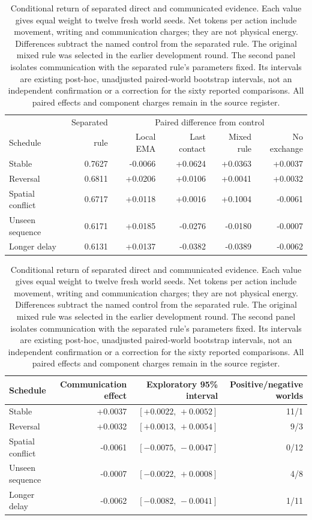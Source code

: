 \begin{table}[htbp]\centering\small
\caption{Conditional return of separated direct and communicated evidence. Each value gives equal weight to twelve fresh world seeds. Net tokens per action include movement, writing and communication charges; they are not physical energy. Differences subtract the named control from the separated rule. The original mixed rule was selected in the earlier development round. The second panel isolates communication with the separated rule's parameters fixed. Its intervals are existing post-hoc, unadjusted paired-world bootstrap intervals, not an independent confirmation or a correction for the sixty reported comparisons. All paired effects and component charges remain in the source register.}
\label{tab:contact}
\begin{tabular}{lrrrrr}\toprule
 & Separated & \multicolumn{4}{c}{Paired difference from control}\\
Schedule & rule & Local EMA & Last contact & Mixed rule & No exchange\\\midrule
Stable & 0.7627 & -0.0066 & +0.0624 & +0.0363 & +0.0037\\
Reversal & 0.6811 & +0.0206 & +0.0106 & +0.0041 & +0.0032\\
Spatial conflict & 0.6717 & +0.0118 & +0.0016 & +0.1004 & -0.0061\\
Unseen sequence & 0.6171 & +0.0185 & -0.0276 & -0.0180 & -0.0007\\
Longer delay & 0.6131 & +0.0137 & -0.0382 & -0.0389 & -0.0062\\
\bottomrule\end{tabular}
\medskip
\begin{tabular}{lrrr}\toprule
Schedule & Communication effect & Exploratory 95\% interval & Positive/negative worlds\\\midrule
Stable & +0.0037 & $[+0.0022,\,+0.0052]$ & 11/1\\
Reversal & +0.0032 & $[+0.0013,\,+0.0054]$ & 9/3\\
Spatial conflict & -0.0061 & $[-0.0075,\,-0.0047]$ & 0/12\\
Unseen sequence & -0.0007 & $[-0.0022,\,+0.0008]$ & 4/8\\
Longer delay & -0.0062 & $[-0.0082,\,-0.0041]$ & 1/11\\
\bottomrule\end{tabular}
\end{table}
